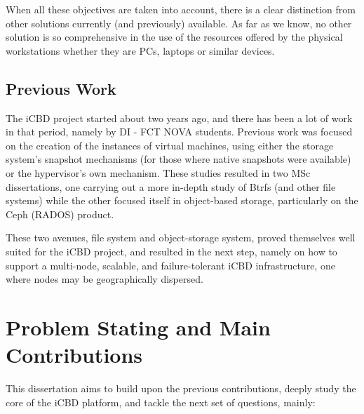 When all these objectives are taken into account, there is a clear distinction from other solutions currently (and previously) available. As far as we know, no other solution is so comprehensive in the use of the resources offered by the physical workstations whether they are PCs, laptops or similar devices.


\subsection{Previous Work} %
\label{sub:intro_previous_work}

The iCBD project started about two years ago, and there has been a lot of work in that period, namely by DI - FCT NOVA students. Previous work was focused on the creation of the instances of virtual machines, using either the storage system’s snapshot mechanisms (for those where native snapshots were available) or the hypervisor’s own mechanism. These studies resulted in two MSc dissertations, one carrying out a more in-depth study of Btrfs (and other file systems) while the other focused itself in object-based storage, particularly on the Ceph (RADOS) product.

These two avenues, file system and object-storage system, proved themselves well suited for the iCBD project, and resulted in the next step, namely on how to support a multi-node, scalable, and failure-tolerant iCBD infrastructure, one where nodes may be geographically dispersed.

\newpage

\section{Problem Stating and Main Contributions}
\label{sec:intro_project_contributions}

This dissertation aims to build upon the previous contributions, deeply study the core of the iCBD platform, and tackle the next set of questions, mainly:

